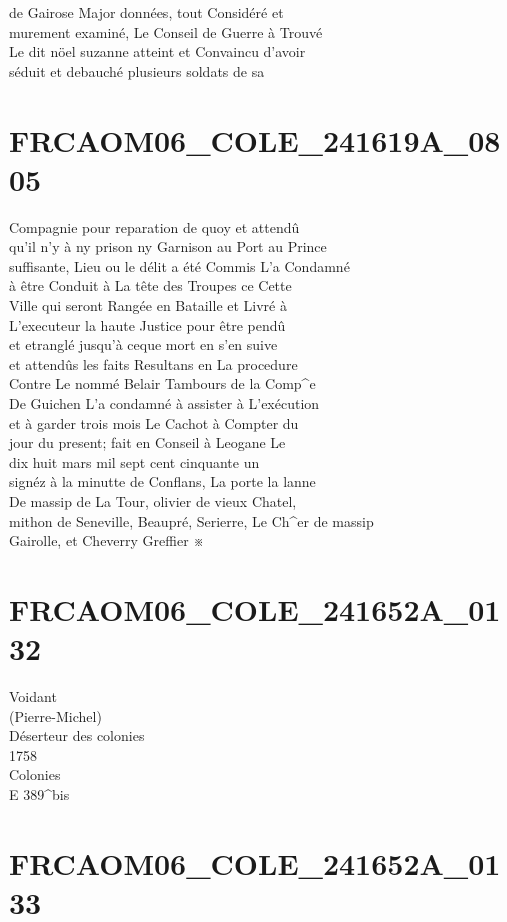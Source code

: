 \documentclass{article}
\begin{document}
\begin{pages}
de Gairose Major données, tout Considéré et\\
murement examiné, Le Conseil de Guerre à Trouvé\\
Le dit nöel suzanne atteint et Convaincu d'avoir\\
séduit et debauché plusieurs soldats de sa
\pend
\endnumbering\beginnumbering\section{FRCAOM06\_COLE\_241619A\_0805}\pstart
Compagnie pour reparation de quoy et attendû\\
qu'il n'y à ny prison ny Garnison au Port au Prince\\
suffisante, Lieu ou le délit a été Commis L'a Condamné\\
à être Conduit à La tête des Troupes ce Cette\\
Ville qui seront Rangée en Bataille et Livré à\\
L'executeur la haute Justice pour être pendû\\
et etranglé jusqu'à ceque mort en s'en suive\\
et attendûs les faits Resultans en La procedure\\
Contre Le nommé Belair Tambours de la Comp\^{}e\\
De Guichen L'a condamné à assister à L'exécution\\
et à garder trois mois Le Cachot à Compter du\\
jour du present; fait en Conseil à Leogane Le\\
dix huit mars mil sept cent cinquante un\\
signéz à la minutte de Conflans, La porte la lanne\\
De massip de La Tour, olivier de vieux Chatel,\\
mithon de Seneville, Beaupré, Serierre, Le Ch\^{}er de massip\\
Gairolle, et Cheverry Greffier ※
\pend
\endnumbering\beginnumbering\section{FRCAOM06\_COLE\_241652A\_0132}\pstart
Voidant\\
(Pierre-Michel)\\
Déserteur des colonies\\
1758\\
Colonies\\
E 389\^{}bis
\pend
\endnumbering\beginnumbering\section{FRCAOM06\_COLE\_241652A\_0133}

\end{pages}
\end{document}
